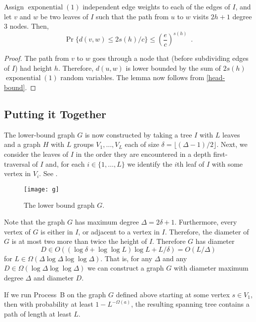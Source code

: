 \documentclass{patmorin}
\DeclareMathOperator{\exponential}{exponential}
\begin{document}
\begin{lem}
   Assign $\exponential(1)$ independent edge weights to each of the edges
   of $I$, and let $v$ and $w$ be two leaves of $I$ such that the path from $u$ to $w$ visits $2h+1$ degree 3 nodes.  Then, 
   \[  
        \Pr\{d(v,w) \le 2s(h)/c  \} \le \left(\frac{e}{c}\right)^{s(h)} \enspace .
   \]
\end{lem}

\begin{proof}
   The path from $v$ to $w$ goes through a node that (before subdividing
   edges of $I$) had height $h$. Therefore, $d(u,w)$ is lower bounded
   by the sum of $2s(h)$ $\exponential(1)$ random variables.  The lemma
   now follows from \eqref{head-bound}.
\end{proof}

\subsection{Putting it Together}

The lower-bound graph $G$ is now constructed by taking a tree $I$ with
$L$ leaves and a graph $H$ with $L$ groups $V_1,\ldots,V_L$ each of
size $\delta=\lfloor(\Delta-1)/2\rfloor$.  Next, we consider the leaves of $I$ in the order they are encountered in a depth first-traversal of $I$ and, for each $i\in\{1,\ldots,L\}$ we identify the $i$th leaf of $I$ with some vertex in $V_i$.  See .

\begin{figure}
  \begin{center}
    \texttt{[image: g]}
  \end{center}
  \caption{The lower bound graph $G$.}
\end{figure}

Note that the graph $G$ has maximum degree $\Delta=2\delta+1$.
Furthermore, every vertex of $G$ is either in $I$, or adjacent to a
vertex in $I$.  Therefore, the diameter of $G$ is at most two more than
twice the height of $I$. Therefore $G$ has diameter
\[
   D\in O((\log\delta + \log\log L)\log L + L/\delta) = O(L/\Delta)
\]
for $L\in\Omega(\Delta\log\Delta\log\log\Delta)$.  That is, for any
$\Delta$ and any $D\in\Omega(\log\Delta\log\log\Delta)$ we can construct
a graph $G$ with diameter maximum degree $\Delta$ and diameter $D$.

\begin{thm}
  If we run Process~B on the graph $G$ defined above starting at some
  vertex $s\in V_1$, then with probability at least $1-L^{-\Omega(a)}$,
  the resulting spanning tree contains a path of length at least $L$.
\end{thm}
\end{document}
